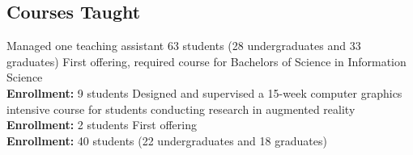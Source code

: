 \documentclass[10pt,letterpaper,final]{moderncv}
\begin{document}
\subsection{Courses Taught}
{\small Managed one teaching assistant  63 students (28 undergraduates and 33 graduates)}\vspace{6pt}
{\small First offering, required course for Bachelors of Science in Information Science\\ {\textcolor{color5}{\textbf{Enrollment:}}} 9 students\vspace{6pt}}
{\small Designed and supervised a 15-week computer graphics intensive course for students conducting research in augmented reality \\ {\textcolor{color5}{\textbf{Enrollment:}}} 2 students\vspace{6pt}}
{\small First offering\\ {\textcolor{color5}{\textbf{Enrollment:}}} 40 students (22 undergraduates and 18 graduates)}\vspace{6pt}
\end{document}
